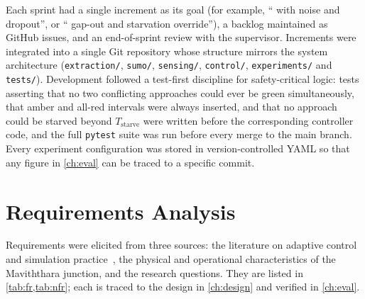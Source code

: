 Each sprint had a single increment as its goal (for example, ``\vls{} with noise and dropout'', or ``\prism{} gap-out and starvation override''), a backlog maintained as GitHub issues, and an end-of-sprint review with the supervisor. Increments were integrated into a single Git repository whose structure mirrors the system architecture (\texttt{extraction/}, \texttt{sumo/}, \texttt{sensing/}, \texttt{control/}, \texttt{experiments/} and \texttt{tests/}). Development followed a test-first discipline for safety-critical logic: tests asserting that no two conflicting approaches could ever be green simultaneously, that amber and all-red intervals were always inserted, and that no approach could be starved beyond $T_{\text{starve}}$ were written before the corresponding controller code, and the full \texttt{pytest} suite was run before every merge to the main branch. Every experiment configuration was stored in version-controlled YAML so that any figure in \cref{ch:eval} can be traced to a specific commit.

\section{Requirements Analysis}\label{sec:method-req}

Requirements were elicited from three sources: the literature on adaptive control and simulation practice~\cite{koonce2008timing,dowling2004toolbox}, the physical and operational characteristics of the Maviththara junction, and the research questions. They are listed in \cref{tab:fr,tab:nfr}; each is traced to the design in \cref{ch:design} and verified in \cref{ch:eval}.

